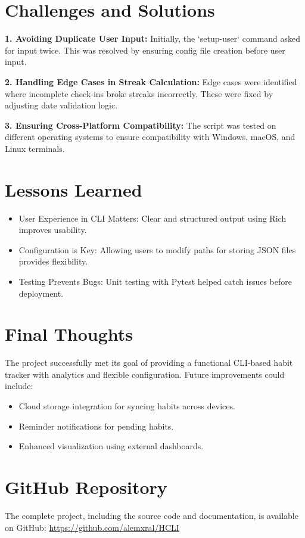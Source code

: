 \documentclass[a4paper,12pt]{article}
\begin{document}
\section{Challenges and Solutions}
\textbf{1. Avoiding Duplicate User Input:}  
Initially, the `setup-user` command asked for input twice. This was resolved by ensuring config file creation before user input.

\textbf{2. Handling Edge Cases in Streak Calculation:}  
Edge cases were identified where incomplete check-ins broke streaks incorrectly. These were fixed by adjusting date validation logic.

\textbf{3. Ensuring Cross-Platform Compatibility:}  
The script was tested on different operating systems to ensure compatibility with Windows, macOS, and Linux terminals.

\section{Lessons Learned}
\begin{itemize}
    \item User Experience in CLI Matters: Clear and structured output using Rich improves usability.
    \item Configuration is Key: Allowing users to modify paths for storing JSON files provides flexibility.
    \item Testing Prevents Bugs: Unit testing with Pytest helped catch issues before deployment.
\end{itemize}

\section{Final Thoughts}
The project successfully met its goal of providing a functional CLI-based habit tracker with analytics and flexible configuration. Future improvements could include:
\begin{itemize}
    \item Cloud storage integration for syncing habits across devices.
    \item Reminder notifications for pending habits.
    \item Enhanced visualization using external dashboards.
\end{itemize}

\section{GitHub Repository}
The complete project, including the source code and documentation, is available on GitHub:  
\url{https://github.com/alemxral/HCLI}
\end{document}
